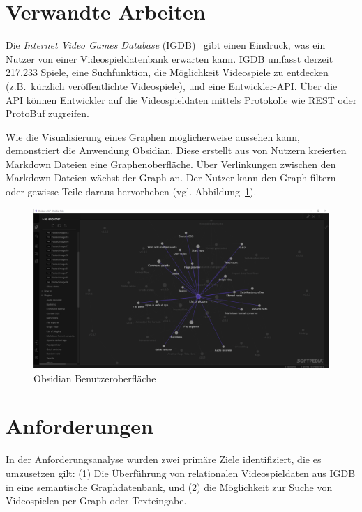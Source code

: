 \documentclass[a4paper, 10pt, conference]{IEEEtran}
\begin{document}
\section{Verwandte Arbeiten}\label{sec:verwandte_arbeiten}

Die \textit{Internet Video Games Database} (IGDB)~\cite{igdb} gibt einen Eindruck, was ein Nutzer von einer Videospieldatenbank erwarten kann. IGDB umfasst derzeit 217.233 Spiele, eine Suchfunktion, die Möglichkeit Videospiele zu entdecken (z.B.\ kürzlich veröffentlichte Videospiele), und eine Entwickler-API. Über die API können Entwickler auf die Videospieldaten mittels Protokolle wie REST oder ProtoBuf zugreifen.

Wie die Visualisierung eines Graphen möglicherweise aussehen kann, demonstriert die Anwendung Obsidian. Diese erstellt aus von Nutzern kreierten Markdown Dateien eine Graphenoberfläche. Über Verlinkungen zwischen den Markdown Dateien wächst der Graph an. Der Nutzer kann den Graph filtern oder gewisse Teile daraus hervorheben (vgl. Abbildung~\ref{fig:obsidian}).

\begin{figure}[thpb]
    \centering
    \includegraphics[scale=0.17]{obsidian}
    \caption{Obsidian Benutzeroberfläche~\cite{obsidian}}
    \label{fig:obsidian}
\end{figure}


\section{Anforderungen}\label{sec:anforderungen}

In der Anforderungsanalyse wurden zwei primäre Ziele identifiziert, die es umzusetzen gilt: (1) Die Überführung von relationalen Videospieldaten aus IGDB in eine semantische Graphdatenbank, und (2) die Möglichkeit zur Suche von Videospielen per Graph oder Texteingabe.
\end{document}
